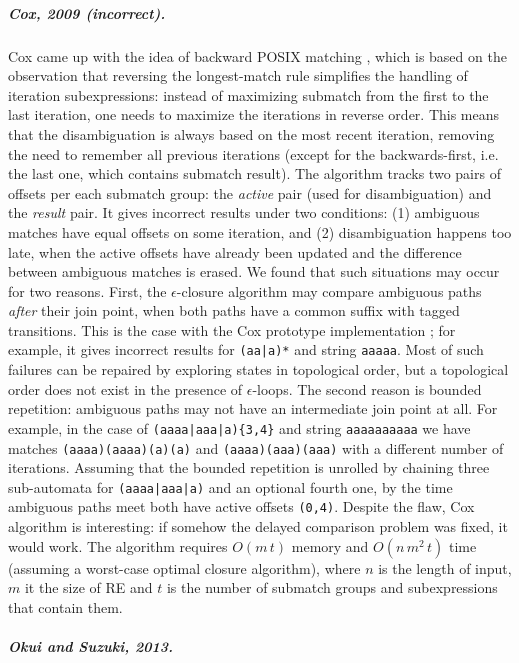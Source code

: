 \documentclass[AMA,STIX1COL]{WileyNJD-v2}
\begin{document}
\subparagraph{Cox, 2009 (incorrect).}

Cox came up with the idea of backward POSIX matching \cite{Cox09},
which is based on the observation that
reversing the longest-match rule simplifies the handling of iteration subexpressions:
instead of maximizing submatch from the first to the last iteration, one needs to maximize the iterations in reverse order.
This means that the disambiguation is always based on the most recent iteration,
removing the need to remember all previous iterations
(except for the backwards-first, i.e. the last one, which contains submatch result).
The algorithm tracks two pairs of offsets per each submatch group:
the \emph{active} pair (used for disambiguation)
and the \emph{result} pair.
It gives incorrect results under two conditions:
(1) ambiguous matches have equal offsets on some iteration,
and (2) disambiguation happens too late, when the active offsets have already been updated and the difference between ambiguous matches is erased.
We found that such situations may occur for two reasons.
First, the $\epsilon$-closure algorithm may compare ambiguous paths \emph{after} their join point,
when both paths have a common suffix with tagged transitions.
This is the case with the Cox prototype implementation \cite{Cox09}; for example, it gives incorrect results for \texttt{(aa|a)*} and string \texttt{aaaaa}.
Most of such failures can be repaired by exploring states in topological order,
but a topological order does not exist in the presence of $\epsilon$-loops.
The second reason is bounded repetition: ambiguous paths may not have an intermediate join point at all.
For example, in the case of \texttt{(aaaa|aaa|a)\{3,4\}} and string \texttt{aaaaaaaaaa}
we have matches \texttt{(aaaa)(aaaa)(a)(a)} and \texttt{(aaaa)(aaa)(aaa)}
with a different number of iterations.
Assuming that the bounded repetition is unrolled by chaining three sub-automata for \texttt{(aaaa|aaa|a)} and an optional fourth one,
by the time ambiguous paths meet both have active offsets \texttt{(0,4)}.
Despite the flaw, Cox algorithm is interesting: if somehow the delayed comparison problem was fixed, it would work.
The algorithm requires $O(m \, t)$ memory and $O(n \, m^2 \, t)$ time
(assuming a worst-case optimal closure algorithm),
where $n$ is the length of input,
$m$ it the size of RE
and $t$ is the number of submatch groups and subexpressions that contain them.

\subparagraph{Okui and Suzuki, 2013.}
\end{document}
